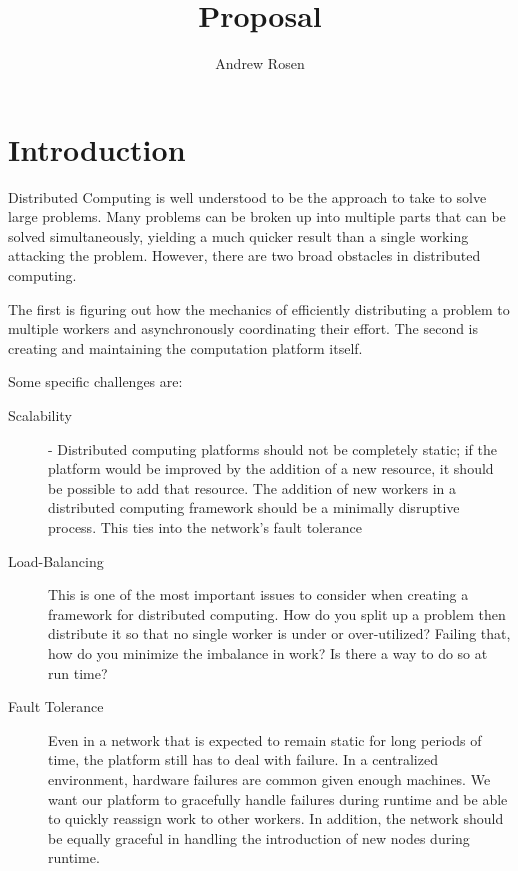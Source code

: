 \documentclass[10pt,letterpaper,twoside]{report}
\title{Proposal}
\author{Andrew Rosen}
\begin{document}
\maketitle
\setcounter{tocdepth}{4}
\tableofcontents
\newpage
\chapter{Introduction}


Distributed Computing is well understood to be the approach to take to solve large problems.  
Many problems can be broken up into multiple parts that can be solved simultaneously, yielding a much quicker result than a single working attacking the problem.
However, there are two broad obstacles in distributed computing.

The first is figuring out how the mechanics of efficiently distributing a problem to multiple workers and asynchronously coordinating their effort.  
The second is creating and maintaining the computation platform itself.


Some specific challenges are:
\begin{description}
	\item[Scalability] - Distributed computing platforms should not be completely static; if the platform would be improved by the addition of a new resource, it should be possible to add that resource.  
	The addition of new workers in a distributed computing framework should be a minimally disruptive process.
    This ties into the network's fault tolerance
	\item[Load-Balancing]  This is one of the most important issues to consider when creating a framework for distributed computing. 
    How do you split up a problem then distribute it so that no single worker is under or over-utilized?
    Failing that, how do you minimize the imbalance in work?
    Is there a way to do so at run time?
    \item[Fault Tolerance]  Even in a network that is expected to remain static for long periods of time, the platform still has to deal with failure.  
    In a centralized environment, hardware failures are common given enough machines.
    We want our platform to gracefully handle failures during runtime and be able to quickly reassign work to other workers.
    In addition, the network should be equally graceful in handling the introduction of new nodes during runtime.
\end{description}
\end{document}
